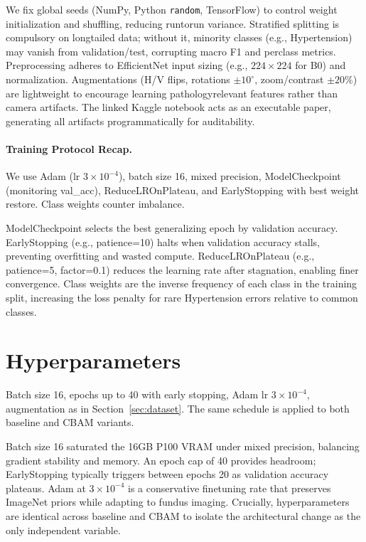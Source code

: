 We fix global seeds (NumPy, Python \texttt{random}, TensorFlow) to control weight initialization and shuffling, reducing run\textendash to\textendash run variance. Stratified splitting is compulsory on long\textendash tailed data; without it, minority classes (e.g., Hypertension) may vanish from validation/test, corrupting macro F1 and per\textendash class metrics. Preprocessing adheres to EfficientNet input sizing (e.g., $224\times224$ for B0) and normalization. Augmentations (H/V flips, rotations $\pm10^{\circ}$, zoom/contrast $\pm20\%$) are lightweight to encourage learning pathology\textendash relevant features rather than camera artifacts. The linked Kaggle notebook acts as an executable paper, generating all artifacts programmatically for auditability.

\paragraph{Training Protocol Recap.} We use Adam (lr $3\times10^{-4}$), batch size 16, mixed precision, ModelCheckpoint (monitoring val\_acc), ReduceLROnPlateau, and EarlyStopping with best weight restore. Class weights counter imbalance.

ModelCheckpoint selects the best generalizing epoch by validation accuracy. EarlyStopping (e.g., patience=10) halts when validation accuracy stalls, preventing overfitting and wasted compute. ReduceLROnPlateau (e.g., patience=5, factor=0.1) reduces the learning rate after stagnation, enabling finer convergence. Class weights are the inverse frequency of each class in the training split, increasing the loss penalty for rare Hypertension errors relative to common classes.

\section{Hyperparameters}
Batch size 16, epochs up to 40 with early stopping, Adam lr $3\times10^{-4}$, augmentation as in Section~\ref{sec:dataset}. The same schedule is applied to both baseline and CBAM variants.

Batch size 16 saturated the 16GB P100 VRAM under mixed precision, balancing gradient stability and memory. An epoch cap of 40 provides headroom; EarlyStopping typically triggers between epochs 20 as validation accuracy plateaus. Adam at $3\times10^{-4}$ is a conservative fine\textendash tuning rate that preserves ImageNet priors while adapting to fundus imaging. Crucially, hyperparameters are identical across baseline and CBAM to isolate the architectural change as the only independent variable.

